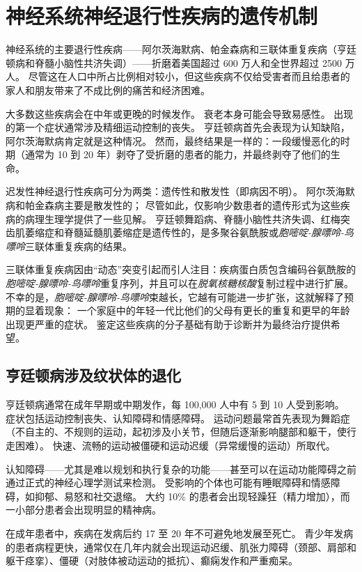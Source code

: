 \chapter{神经系统神经退行性疾病的遗传机制} \label{chap:chap63}

神经系统的主要退行性疾病——阿尔茨海默病、帕金森病和三联体重复疾病（亨廷顿病和脊髓小脑性共济失调）——折磨着美国超过 600 万人和全世界超过 2500 万人。
尽管这在人口中所占比例相对较小，但这些疾病不仅给受害者而且给患者的家人和朋友带来了不成比例的痛苦和经济困难。


大多数这些疾病会在中年或更晚的时候发作。
衰老本身可能会导致易感性。
出现的第一个症状通常涉及精细运动控制的丧失。
亨廷顿病首先会表现为认知缺陷，阿尔茨海默病肯定就是这种情况。
然而，最终结果是一样的：一段缓慢恶化的时期（通常为 10 到 20 年）剥夺了受折磨的患者的能力，并最终剥夺了他们的生命。


迟发性神经退行性疾病可分为两类：遗传性和散发性（即病因不明）。
阿尔茨海默病和帕金森病主要是散发性的；
尽管如此，仅影响少数患者的遗传形式为这些疾病的病理生理学提供了一些见解。
亨廷顿舞蹈病、脊髓小脑性共济失调、红梅突齿肌萎缩症和脊髓延髓肌萎缩症是遗传性的，是多聚谷氨酰胺或\textit{胞嘧啶-腺嘌呤-鸟嘌呤}三联体重复疾病的结果。


三联体重复疾病因由“动态”突变引起而引人注目：疾病蛋白质包含编码谷氨酰胺的\textit{胞嘧啶-腺嘌呤-鸟嘌呤}重复序列，并且可以在\textit{脱氧核糖核酸}复制过程中进行扩展。
不幸的是，\textit{胞嘧啶-腺嘌呤-鸟嘌呤}束越长，它越有可能进一步扩张，这就解释了预期的显着现象：
一个家庭中的年轻一代比他们的父母有更长的重复和更早的年龄出现更严重的症状。
鉴定这些疾病的分子基础有助于诊断并为最终治疗提供希望。



\section{亨廷顿病涉及纹状体的退化}

亨廷顿病通常在成年早期或中期发作，每 100,000 人中有 5 到 10 人受到影响。
症状包括运动控制丧失、认知障碍和情感障碍。
运动问题最常首先表现为舞蹈症（不自主的、不规则的运动，起初涉及小关节，但随后逐渐影响腿部和躯干，使行走困难）。
快速、流畅的运动被僵硬和运动迟缓（异常缓慢的运动）所取代。


认知障碍——尤其是难以规划和执行复杂的功能——甚至可以在运动功能障碍之前通过正式的神经心理学测试来检测。
受影响的个体也可能有睡眠障碍和情感障碍，如抑郁、易怒和社交退缩。
大约 10\% 的患者会出现轻躁狂（精力增加），而一小部分患者会出现明显的精神病。


在成年患者中，疾病在发病后约 17 至 20 年不可避免地发展至死亡。
青少年发病的患者病程更快，通常仅在几年内就会出现运动迟缓、肌张力障碍（颈部、肩部和躯干痉挛）、僵硬（对肢体被动运动的抵抗）、癫痫发作和严重痴呆。


